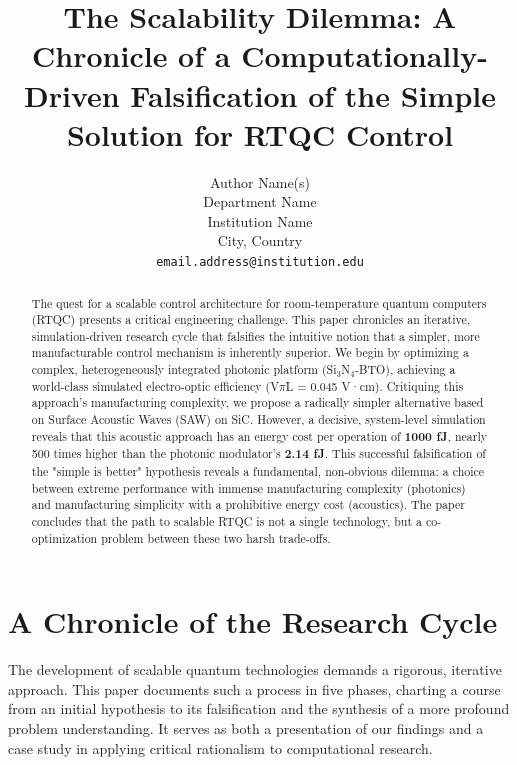 \documentclass{article}
\title{The Scalability Dilemma: A Chronicle of a Computationally-Driven Falsification of the Simple Solution for RTQC Control}
\author{%
  Author Name(s) \\
  Department Name \\
  Institution Name \\
  City, Country \\
  \texttt{email.address@institution.edu} \\
}
\begin{document}

\maketitle

\begin{abstract}
The quest for a scalable control architecture for room-temperature quantum computers (RTQC) presents a critical engineering challenge. This paper chronicles an iterative, simulation-driven research cycle that falsifies the intuitive notion that a simpler, more manufacturable control mechanism is inherently superior. We begin by optimizing a complex, heterogeneously integrated photonic platform (Si$_3$N$_4$-BTO), achieving a world-class simulated electro-optic efficiency (V$\pi$L = 0.045 V·cm). Critiquing this approach's manufacturing complexity, we propose a radically simpler alternative based on Surface Acoustic Waves (SAW) on SiC. However, a decisive, system-level simulation reveals that this acoustic approach has an energy cost per operation of \textbf{1000 fJ}, nearly 500 times higher than the photonic modulator's \textbf{2.14 fJ}. This successful falsification of the "simple is better" hypothesis reveals a fundamental, non-obvious dilemma: a choice between extreme performance with immense manufacturing complexity (photonics) and manufacturing simplicity with a prohibitive energy cost (acoustics). The paper concludes that the path to scalable RTQC is not a single technology, but a co-optimization problem between these two harsh trade-offs.
\end{abstract}

\section{A Chronicle of the Research Cycle}
The development of scalable quantum technologies demands a rigorous, iterative approach. This paper documents such a process in five phases, charting a course from an initial hypothesis to its falsification and the synthesis of a more profound problem understanding. It serves as both a presentation of our findings and a case study in applying critical rationalism to computational research.

\end{document}
